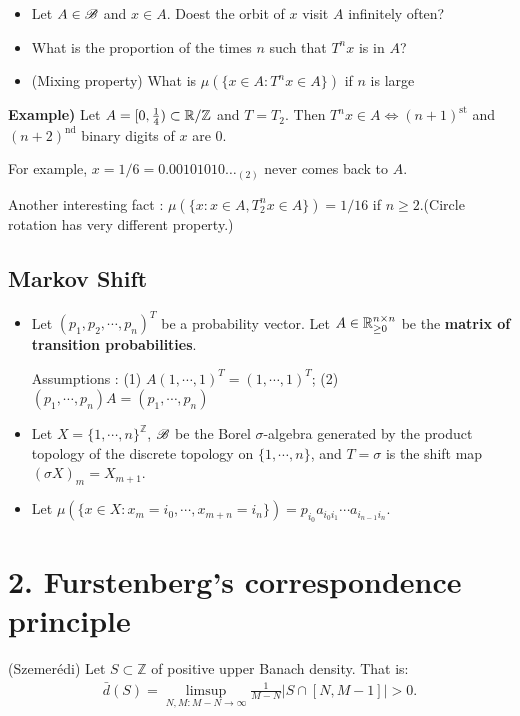 \documentclass[10pt,a4paper]{report}
\begin{document}
\begin{itemize}
\item Let $A \in \mathscr{B}$ and $ x\in A$. Doest the orbit of $x$ visit $A$ infinitely often?

\item What is the proportion of the times $n$ such that $T^n x$ is in $A$? 

\item (Mixing property) What is $\mu(\{x \in A : T^nx \in A\})$ if $n$ is large
\end{itemize}
\s

\textbf{Example)} Let $A = [0,\frac{1}{4}) \subset \mathbb{R}/\mathbb{Z}$ and $T = T_2$. Then $T^n x \in A \Leftrightarrow (n+1)^{\text{st}}$ and $(n+2)^{\text{nd}}$ binary digits of $x$ are 0.

For example, $x = 1/6 = 0.00101010\ldots_{(2)}$ never comes back to $A$.

Another interesting fact : $\mu(\{x : x\in A, T_2^n x \in A \}) = 1/16$ if $n\geq2$.(Circle rotation has very different property.)
\s

\subsection*{Markov Shift}

\begin{itemize}
\item Let $(p_1, p_2, \cdots, p_n)^T$ be a probability vector. Let $A \in \mathbb{R}_{\geq 0}^{n\times n}$ be the \textbf{matrix of transition probabilities}.

Assumptions : (1) $A(1,\cdots,1)^T = (1,\cdots,1)^T$; (2) $(p_1, \cdots, p_n) A = (p_1, \cdots, p_n)$

\item Let $X = \{ 1,\cdots,n\}^{\mathbb{Z}}$, $\mathscr{B}$ be the Borel $\sigma$-algebra generated by the product topology of the discrete topology on $\{1,\cdots, n\}$, and $T = \sigma$ is the shift map $(\sigma X)_m = X_{m+1}$.

\item Let $\mu(\{x\in X : x_m=i_0,\cdots,x_{m+n}=i_n\}) = p_{i_0} a_{i_0 i_1} \cdots a_{i_{n-1} i_n}$.
\end{itemize}
\s

\section*{2. Furstenberg's correspondence principle}

\thm (Szemer\'{e}di) Let $S \subset \mathbb{Z}$ of positive upper Banach density. That is:
\begin{align*}
\bar{d}(S) = \limsup_{N,M : M-N \rightarrow \infty} \frac{1}{M-N}|S \cap [N,M-1] | >0.
\end{align*}
\end{document}
